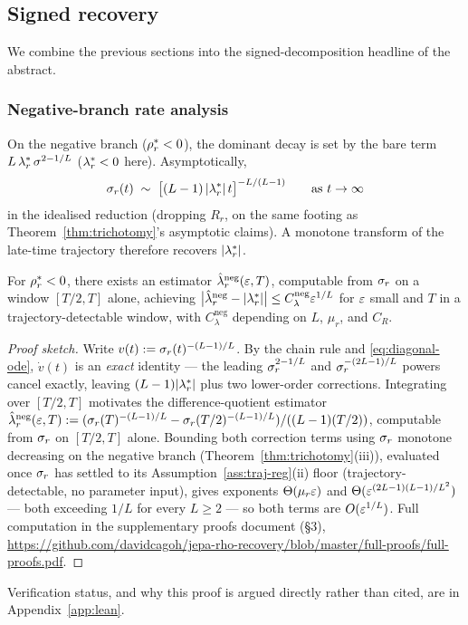 \subsection{Signed recovery}
\label{sec:signed-recovery}

We combine the previous sections into the signed-decomposition headline
of the abstract.

\subsubsection{Negative-branch rate analysis}
\label{ssec:negative-rate}

On the negative branch ($\rho_r^* < 0$), the dominant decay is set by
the bare term $L\,\lambda_r^*\,\sigma^{2-1/L}$ ($\lambda_r^* < 0$ here).
Asymptotically,
\[
\sigma_r(t) \;\sim\; \big[(L-1)\,|\lambda_r^*|\,t\big]^{-L/(L-1)}
\qquad
\text{as } t \to \infty
\]
in the idealised reduction (dropping $R_r$, on the same footing as
Theorem~\ref{thm:trichotomy}'s asymptotic claims). A monotone
transform of the late-time trajectory therefore recovers $|\lambda_r^*|$.

\begin{proposition}
\label{prop:neg-lambda}
For $\rho_r^* < 0$, there exists an estimator
$\hat{\lambda}_r^{\mathrm{neg}}(\varepsilon, T)$, computable from $\sigma_r$ on a
window $[T/2, T]$ alone, achieving
$\big|\hat{\lambda}_r^{\mathrm{neg}} - |\lambda_r^*|\big| \le C_\lambda^{\mathrm{neg}} \varepsilon^{1/L}$
for $\varepsilon$ small and $T$ in a trajectory-detectable window, with
$C_\lambda^{\mathrm{neg}}$ depending on $L$, $\mu_r$, and $C_R$.
\end{proposition}

\begin{proof}[Proof sketch]
Write $v(t) := \sigma_r(t)^{-(L-1)/L}$. By the chain rule and \eqref{eq:diagonal-ode},
$\dot v(t)$ is an \emph{exact} identity — the leading $\sigma_r^{2-1/L}$ and
$\sigma_r^{-(2L-1)/L}$ powers cancel exactly, leaving $(L-1)|\lambda_r^*|$ plus two
lower-order corrections. Integrating over $[T/2,T]$ motivates the difference-quotient
estimator $\hat{\lambda}_r^{\mathrm{neg}}(\varepsilon,T) :=
(\sigma_r(T)^{-(L-1)/L}-\sigma_r(T/2)^{-(L-1)/L})/((L-1)(T/2))$, computable from
$\sigma_r$ on $[T/2,T]$ alone. Bounding both correction terms using $\sigma_r$ monotone
decreasing on the negative branch (Theorem~\ref{thm:trichotomy}(iii)), evaluated once
$\sigma_r$ has settled to its Assumption~\ref{ass:traj-reg}(ii) floor
(trajectory-detectable, no parameter input), gives exponents $\Theta(\mu_r\varepsilon)$ and
$\Theta(\varepsilon^{(2L-1)(L-1)/L^2})$ — both exceeding $1/L$ for every $L\ge2$ — so both
terms are $O(\varepsilon^{1/L})$. Full computation in the supplementary proofs document (\S3),
\url{https://github.com/davidcagoh/jepa-rho-recovery/blob/master/full-proofs/full-proofs.pdf}.
\end{proof}
Verification status, and why this proof is argued directly rather than cited, are in
Appendix~\ref{app:lean}.

